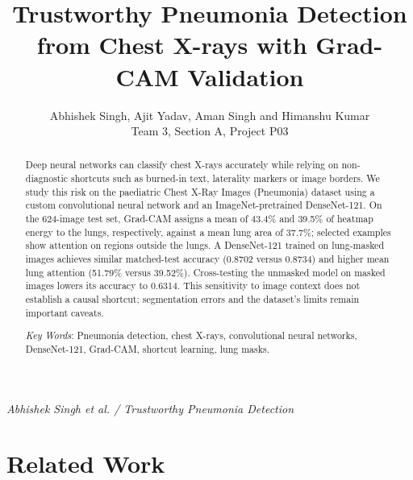 \documentclass[twoside,a4paper,11pt]{article}
\title{Trustworthy Pneumonia Detection from Chest X-rays with Grad-CAM Validation}
\author{Abhishek Singh, Ajit Yadav, Aman Singh and Himanshu Kumar\\
  \small Team 3, Section A, Project P03}
\date{}
\begin{document}
\maketitle
\pagestyle{myheadings}
         {\small\itshape Abhishek Singh et al. / Trustworthy Pneumonia Detection}
\hrulefill

\begin{abstract}
Deep neural networks can classify chest X-rays accurately while relying on non-diagnostic shortcuts such as burned-in text, laterality markers or image borders. We study this risk on the paediatric Chest X-Ray Images (Pneumonia) dataset using a custom convolutional neural network and an ImageNet-pretrained DenseNet-121. On the 624-image test set, Grad-CAM assigns a mean of 43.4\% and 39.5\% of heatmap energy to the lungs, respectively, against a mean lung area of 37.7\%; selected examples show attention on regions outside the lungs. A DenseNet-121 trained on lung-masked images achieves similar matched-test accuracy (0.8702 versus 0.8734) and higher mean lung attention (51.79\% versus 39.52\%). Cross-testing the unmasked model on masked images lowers its accuracy to 0.6314. This sensitivity to image context does not establish a causal shortcut; segmentation errors and the dataset's limits remain important caveats.

\vspace{0.3cm}
\noindent
{\em Key Words}: Pneumonia detection, chest X-rays, convolutional neural networks, DenseNet-121, Grad-CAM, shortcut learning, lung masks.
\end{abstract}
\hrulefill



\section{Related Work}








\end{document}
